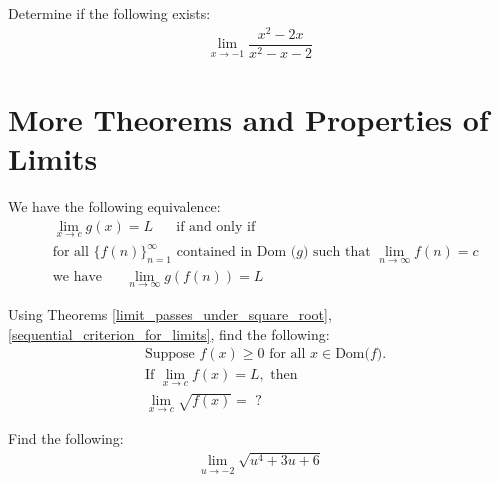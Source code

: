 \begin{exercise}
Determine if the following exists:
\begin{align*}
\lim_{x \longrightarrow -1} \dfrac{x^{2}-2x}{x^{2}-x-2}
\end{align*}
\end{exercise}



\newpage
\section{More Theorems and Properties of Limits}

\begin{theorem}
We have the following equivalence:
\begin{align*}
    &\lim_{x \longrightarrow c} g(x) = L \hspace{20pt} \text{if and only if}\\[2ex]
    &\text{for all} \hspace{4pt} \{f(n)\}_{n=1}^{\infty} \hspace{4pt} \text{contained in Dom ($g$) such that} \hspace{4pt} \lim_{n \longrightarrow \infty} f(n)=c\\[2ex]
    &\text{we have} \hspace{20pt} \lim_{n \longrightarrow \infty} g(f(n)) = L
\end{align*}
\label{sequential_criterion_for_limits}
\end{theorem}

\begin{exercise}
Using Theorems \ref{limit_passes_under_square_root}, \ref{sequential_criterion_for_limits}, find the following:
\begin{align*}
    &\text{Suppose} \hspace{4pt} f(x) \geq 0 \hspace{4pt} \text{for all} \hspace{4pt} x \in \text{Dom($f$)}.\\[2ex]
    &\text{If} \hspace{4pt} \lim_{x \longrightarrow c} f(x) = L, \hspace{4pt} \text{then}\\[2ex]
    &\lim_{x \longrightarrow c} \sqrt{f(x)} = \hspace{4pt} ?
\end{align*}
\end{exercise}

\begin{exercise}
Find the following:
\begin{align*}
\lim_{u \longrightarrow -2} \sqrt{u^4 + 3u + 6}
\end{align*}
\end{exercise}

